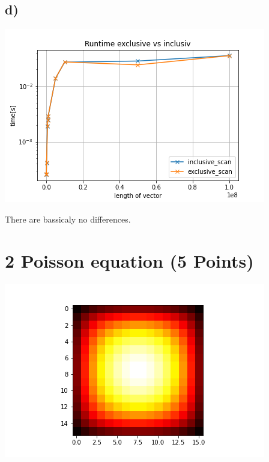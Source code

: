 \documentclass[11pt,a4paper]{article}
\begin{document}
\subsection*{d)}
\begin{center}
	
	\begin{minipage}[t]{0.70\textwidth}
		\includegraphics[width=\textwidth]{Bilder/runtime_excl_vs_inclu}
	\end{minipage}
	
\end{center}
There are bassicaly no differences.
\section*{2 Poisson equation (5 Points)}
\begin{center}
	
	\begin{minipage}[t]{0.70\textwidth}
		\includegraphics[width=\textwidth]{Bilder/solution_16x16}
	\end{minipage}
	
\end{center}
\end{document}
